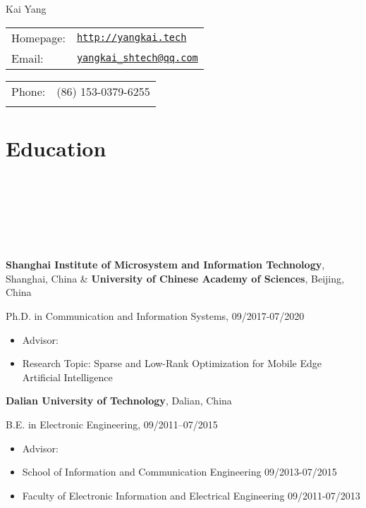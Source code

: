 \documentclass{article}
\def\name{Kai Yang}
\newcommand{\homepage}[3][homepagecolor]{\href{#2}{\color{#1}{#3}}}
\begin{document}
{\huge \name}


\vspace{0.2in}

\begin{minipage}{0.55\linewidth}
  \begin{tabular}{ll}
    Homepage: & \href{http://yangkai.tech/}{\tt http://yangkai.tech} \\
    Email: & \href{mailto:yangkai_shtech@qq.com}{\tt yangkai\_shtech@qq.com} 
  \end{tabular}
\end{minipage}\hspace{2em}
\begin{minipage}{0.45\linewidth}
\begin{tabular}{ll}
    Phone: & (86) 153-0379-6255
    \\ &\\
  \end{tabular}
\end{minipage}


\section*{\colorbox{mygrey}{Education~~~~~~~~~~~~~~~~~~~~~~~~~~~~~~~~~~~~~~~~~~~~~~~~~~~~~~~~~~~~~~~~~~~~~~~~~~~~~~~~~~~~~~~~~~~}}
{\bf{Shanghai Institute of Microsystem and Information Technology}}, Shanghai, China \& {\bf{University of Chinese Academy of Sciences}}, Beijing, China

Ph.D. in Communication and Information Systems, 09/2017-07/2020
\begin{itemize}
  \item Advisor: \homepage{http://shiyuanming.github.io/}{Prof. Yuanming Shi}
  \item Research Topic: {{Sparse and Low-Rank Optimization for Mobile Edge Artificial Intelligence}}
\end{itemize}

{\bf{Dalian University of Technology}}, Dalian, China

B.E. in Electronic Engineering, 09/2011--07/2015
\begin{itemize}
\item Advisor: \homepage{http://faculty.dlut.edu.cn/GuoYanqing}{Prof. Yanqing Guo}
\item School of Information and Communication Engineering 09/2013-07/2015
\item Faculty of Electronic Information and Electrical Engineering 09/2011-07/2013
\end{itemize}
\end{document}
